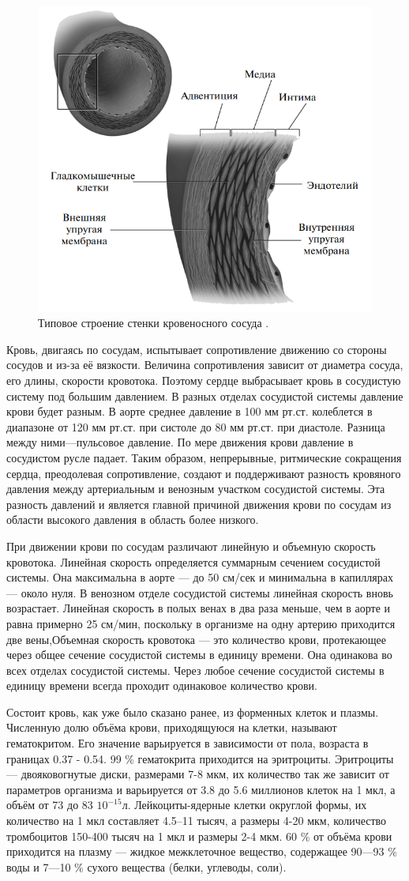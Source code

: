 \documentclass[a4paper, 14pt]{article}
\begin{document}
\begin{figure}[h]
\centering
\includegraphics[width=0.3\linewidth]{stenki.png}
\caption{ Типовое строение стенки кровеносного сосуда \cite{blausen:2014}.}
\label{fig:mpr}
\end{figure}

Кровь, двигаясь по сосудам, испытывает сопротивление движению со стороны сосудов и из-за её вязкости. Величина сопротивления зависит от диаметра сосуда, его длины, скорости кровотока. Поэтому сердце выбрасывает кровь в сосудистую систему под большим давлением. В разных отделах сосудистой системы давление крови будет разным. В аорте среднее давление в 100 мм рт.ст. колеблется в диапазоне от 120 мм рт.ст. при систоле до 80 мм рт.ст. при диастоле. Разница между ними—пульсовое давление. По мере движения крови давление в сосудистом русле падает. Таким образом, непрерывные, ритмические сокращения сердца, преодолевая сопротивление, создают и поддерживают разность кровяного давления между артериальным и венозным участком сосудистой системы. Эта разность давлений и является главной причиной движения крови по сосудам из области высокого давления в область более низкого.

При движении крови по сосудам различают линейную и объемную скорость кровотока. Линейная скорость определяется суммарным сечением сосудистой системы. Она максимальна в аорте — до 50 см/сек и минимальна в капиллярах — около нуля. В венозном отделе сосудистой системы линейная скорость вновь возрастает. Линейная скорость в полых венах в два раза меньше, чем в аорте и равна примерно 25 см/мин, поскольку в организме на одну артерию приходится две вены,Объемная скорость кровотока — это количество крови, протекающее через общее сечение сосудистой системы в единицу времени. Она одинакова во всех отделах сосудистой системы. Через любое сечение сосудистой системы в единицу времени всегда проходит одинаковое количество крови.

Состоит кровь, как уже было сказано ранее, из форменных клеток и плазмы. Численную долю объёма крови, приходящуюся на клетки, называют гематокритом. Его значение варьируется в зависимости от пола, возраста в границах 0.37 - 0.54. 99 \% гематокрита приходится на эритроциты. Эритроциты— двояковогнутые диски, размерами 7-8 мкм, их количество так же зависит от параметров организма и варьируется от 3.8 до 5.6 миллионов клеток на 1 мкл, а объём от 73 до 83 $10^{-15}$л. Лейкоциты-ядерные клетки округлой формы, их количество на 1 мкл составляет 4.5–11 тысяч, а размеры 4-20 мкм, количество тромбоцитов 150-400 тысяч на 1 мкл и размеры 2-4 мкм. 60 \% от объёма крови приходится на плазму — жидкое межклеточное вещество, содержащее 90—93 \% воды и 7—10 \% сухого вещества (белки, углеводы, соли).
\end{document}
